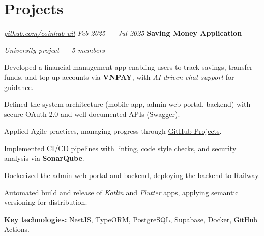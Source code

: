 \section{Projects}

\begin{twocolentry}{
		\textit{\href{https://github.com/coinhub-uit}{github.com/coinhub-uit}}
		\textit{Feb 2025 --- Jul 2025}
	}
	\textbf{Saving Money Application}

	\textit{University project — 5 members}
\end{twocolentry}

\begin{onecolentry}
	\begin{highlights}
		\item Developed a financial management app enabling users to track savings, transfer funds, and top-up
		accounts via \textbf{VNPAY}, with \textit{AI-driven chat support} for guidance.
		\item Defined the system architecture (mobile app, admin web portal, backend) with secure OAuth 2.0 and
		well-documented APIs (Swagger).
		\item Applied Agile practices, managing progress through
		\href{https://github.com/orgs/coinhub-uit/projects/1}{GitHub Projects}.
		\item Implemented CI/CD pipelines with linting, code style checks, and security analysis via \textbf{SonarQube}.
		\item Dockerized the admin web portal and backend, deploying the backend to Railway.
		\item Automated build and release of \textit{Kotlin} and \textit{Flutter} apps, applying semantic
		versioning for distribution.
		\item \textbf{Key technologies:} NestJS, TypeORM, PostgreSQL, Supabase, Docker, GitHub Actions.
	\end{highlights}
\end{onecolentry}

